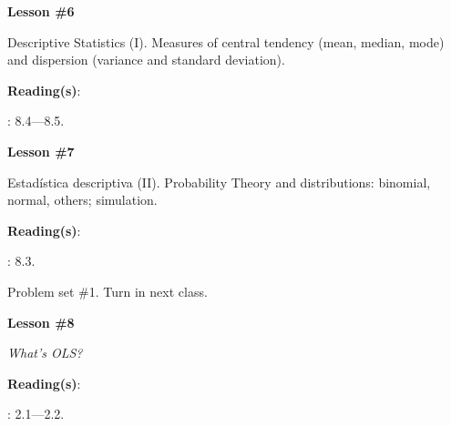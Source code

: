 \documentclass[letterpaper]{article}
\renewenvironment{itemize}{
  \begin{list}{}{
    \setlength{\leftmargin}{1.5em}
  }
}{
  \end{list}
}
\begin{document}
\begin{enumerate}
	\item {}

			\begin{itemize} 
				\item[$\bullet$] {\bf Lesson \#6}
					\begin{itemize} 
				\item[$\circ$] Descriptive Statistics (I). Measures of central tendency (mean, median, mode) and dispersion (variance and standard deviation). %
          \item[$\circ$] {\bf Reading(s)}: 
          \begin{itemize}
            \item[$\diamond$] \textcite{Gill:2006wp}: 8.4---8.5.
          \end{itemize}
					\end{itemize}
			\end{itemize}


			\begin{itemize} 
				\item[$\bullet$] {\bf Lesson \#7}
					\begin{itemize} 
				\item[$\circ$] Estad\'istica descriptiva (II). Probability Theory and distributions: binomial, normal, others; simulation. %
         \item[$\circ$] {\bf Reading(s)}: 
          \begin{itemize}
            \item[$\diamond$] \textcite{Gill:2006wp}: 8.3.
          \end{itemize}
					\end{itemize}
			\end{itemize}


\item[{\color{red}\Pointinghand}] Problem set \#1. Turn in next class.


	\item {}


			\begin{itemize} 
				\item[$\bullet$] {\bf Lesson \#8}
					\begin{itemize} 
						\item[$\circ$] \emph{What's OLS?}
						\item[$\circ$] {\bf Reading(s)}: 
							\begin{itemize}
								\item[$\diamond$] \textcite{Wooldridge2010}: 2.1---2.2.
							\end{itemize}
					\end{itemize}
			\end{itemize}




\end{enumerate}
\end{document}
